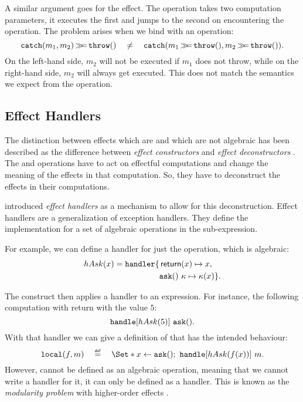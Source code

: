 A similar argument goes for the  effect. The \ocatch operation takes two computation parameters, it executes the first and jumps to the second on encountering the \othrow operation. The problem arises when we bind with an \othrow operation:
\[
    \mathtt{catch}(m_1, m_2) \operatorname{\mathtt{\gg\!\!=}} \mathtt{throw}() \quad\neq\quad \mathtt{catch}(m_1\operatorname{\mathtt{\gg\!\!=}}\mathtt{throw}(), m_2\operatorname{\mathtt{\gg\!\!=}}\mathtt{throw}()).
\]
On the left-hand side, $m_2$ will not be executed if $m_1$ does not throw, while on the right-hand side, $m_2$ will always get executed. This does not match the semantics we expect from the \ocatch operation.

\subsection{Effect Handlers}


The distinction between effects which are and which are not algebraic has been described as the difference between \emph{effect constructors} and \emph{effect deconstructors} \autocite{plotkin_algebraic_2003}. The \olocal and \ocatch operations have to act on effectful computations and change the meaning of the effects in that computation. So, they have to deconstruct the effects in their computations.

\textcite{castagna_handlers_2009} introduced \emph{effect handlers} as a mechanism to allow for this deconstruction. Effect handlers are a generalization of exception handlers. They define the implementation for a set of algebraic operations in the sub-expression.

For example, we can define a handler for just the \oask operation, which is algebraic:
\[
    hAsk(x) = \text{\texttt{handler}} \{
        \begin{aligned}[t]
            &\operatorname{\mathsf{return}}(x) \mapsto x, \\
            &\mathtt{ask}()\ \kappa \mapsto \kappa(x) \}.\\
        \end{aligned}
\]


The \handle construct then applies a handler to an expression. For instance, the following computation with return with the value $5$:
\[
    \text{\texttt{handle}}[hAsk(5)]\ \mathtt{ask}().
\]
With that handler we can give a definition of \olocal that has the intended behaviour:
\[
    \olocal(f, m) \quad\defeq\quad \S{x \gets \oask()\seq \handle[hAsk(f(x))]\ m}.
\]
However, \olocal cannot be defined as an algebraic operation, meaning that we cannot write a handler for it, it can only be defined as a handler. This is known as the \emph{modularity problem} with higher-order effects \autocite{wu_effect_2014}.

